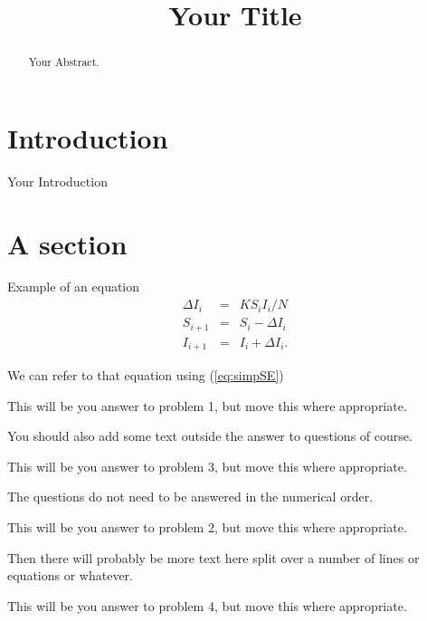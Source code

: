 \documentclass{mm2}
\title{Your Title}
\begin{document}
\begin{abstract}
  Your Abstract.
\end{abstract}



\section{Introduction}
Your Introduction

\section{A section}

Example of an equation
\begin{eqnarray}
\Delta I_i &=& K S_i I_i/N \nonumber\\
S_{i+1} &=& S_i  - \Delta I_i \nonumber\\
I_{i+1} &=& I_i  + \Delta I_i.
\label{eq:simpSE}
\end{eqnarray}

We can refer to that equation using (\ref{eq:simpSE})

\vspace{5mm}
\begin{answer}{1}
  This will be you answer to problem 1, but move this where appropriate.
\end{answer}

You should also add some text outside the answer to questions of course.

\vspace{5mm}
\begin{answer}{3}
  This will be you answer to problem 3, but move this where appropriate.
\end{answer}

The questions do not need to be answered in the numerical order.

\vspace{5mm}
\begin{answer}{2}
  This will be you answer to problem 2, but move this where appropriate.
\end{answer}

Then there will probably be more text here split over a number of lines or
equations or whatever.

\begin{answer}{4}
  This will be you answer to problem 4, but move this where appropriate.
\end{answer}
\end{document}
